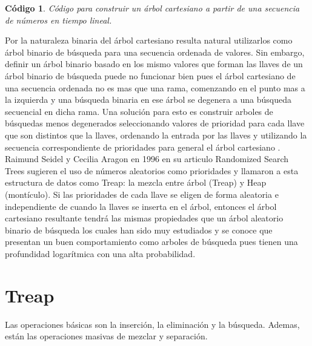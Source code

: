 \documentclass[12pt]{article}
\newcommand{\ct}{árbol cartesiano }
\newtheorem{code}{Código}
\begin{document}
\begin{code}
	Código para construir un \ct a partir de una secuencia de números en tiempo lineal.
	
\end{code}

Por la naturaleza binaria del \ct resulta natural utilizarlos como árbol binario de búsqueda para una secuencia ordenada de valores. Sin embargo, definir un árbol binario basado en los mismo valores que forman las llaves de un árbol binario de búsqueda puede no funcionar bien pues el \ct de una secuencia ordenada no es mas que una rama, comenzando en el punto mas a la izquierda y una búsqueda binaria en ese árbol se degenera a una búsqueda secuencial en dicha rama. Una solución para esto es construir arboles de búsquedas menos degenerados seleccionando valores de prioridad para cada llave que son distintos que la llaves, ordenando la entrada por las llaves y utilizando la secuencia correspondiente de prioridades para general el \ct.\\

Raimund Seidel y Cecilia Aragon en 1996 en su articulo Randomized Search Trees sugieren el uso de números aleatorios como prioridades y llamaron a esta estructura de datos como Treap: la mezcla entre árbol (Treap) y Heap (montículo). Si las prioridades de cada llave se eligen de forma aleatoria e independiente de cuando la llaves se inserta en el árbol, entonces el \ct resultante tendrá las mismas propiedades que un árbol aleatorio binario de búsqueda los cuales han sido muy estudiados y se conoce que presentan un buen comportamiento como arboles de búsqueda pues tienen una profundidad logarítmica con una alta probabilidad.

\section{Treap}

Las operaciones básicas son la inserción, la eliminación y la búsqueda. Ademas, están las operaciones masivas de mezclar y separación.
\end{document}
